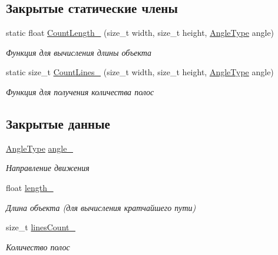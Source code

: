 \subsection*{Закрытые статические члены}
\begin{DoxyCompactItemize}
\item 
static float \hyperlink{classrtm_1_1_driveway_object_a6ebdc5c00005dbc2e96243767ba33273}{Count\+Length\+\_\+} (size\+\_\+t width, size\+\_\+t height, \hyperlink{namespacertm_a69dc82b16a0148c10962caa83d930f89}{Angle\+Type} angle)
\begin{DoxyCompactList}\small\item\em Функция для вычисления длины объекта \end{DoxyCompactList}\item 
static size\+\_\+t \hyperlink{classrtm_1_1_driveway_object_af8a26a955200fde09d68d606a68c5f8c}{Count\+Lines\+\_\+} (size\+\_\+t width, size\+\_\+t height, \hyperlink{namespacertm_a69dc82b16a0148c10962caa83d930f89}{Angle\+Type} angle)
\begin{DoxyCompactList}\small\item\em Функция для получения количества полос \end{DoxyCompactList}\end{DoxyCompactItemize}
\subsection*{Закрытые данные}
\begin{DoxyCompactItemize}
\item 
\mbox{\label{classrtm_1_1_driveway_object_ae1a5ce1c3e82307f34c1d31ad004b075}} 
\hyperlink{namespacertm_a69dc82b16a0148c10962caa83d930f89}{Angle\+Type} \hyperlink{classrtm_1_1_driveway_object_ae1a5ce1c3e82307f34c1d31ad004b075}{angle\+\_\+}
\begin{DoxyCompactList}\small\item\em Направление движения \end{DoxyCompactList}\item 
\mbox{\label{classrtm_1_1_driveway_object_a7338ac80dc7ac9e9a9f109c57fa1ff20}} 
float \hyperlink{classrtm_1_1_driveway_object_a7338ac80dc7ac9e9a9f109c57fa1ff20}{length\+\_\+}
\begin{DoxyCompactList}\small\item\em Длина объекта (для вычисления кратчайшего пути) \end{DoxyCompactList}\item 
\mbox{\label{classrtm_1_1_driveway_object_acb732900dd6a079b71038f3bb8732818}} 
size\+\_\+t \hyperlink{classrtm_1_1_driveway_object_acb732900dd6a079b71038f3bb8732818}{lines\+Count\+\_\+}
\begin{DoxyCompactList}\small\item\em Количество полос \end{DoxyCompactList}\end{DoxyCompactItemize}
